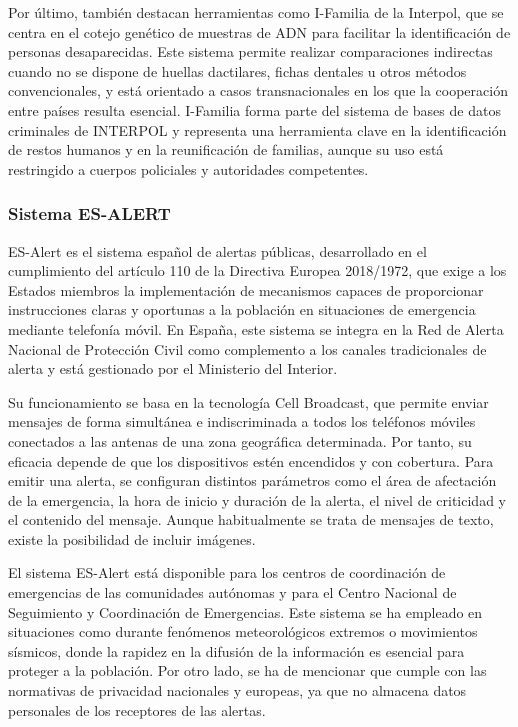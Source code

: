     Por último, también destacan herramientas como I-Familia de la Interpol, que se centra en el cotejo genético de muestras de ADN para facilitar la identificación de personas desaparecidas. Este sistema permite realizar comparaciones indirectas cuando no se dispone de huellas dactilares, fichas dentales u otros métodos convencionales, y está orientado a casos transnacionales en los que la cooperación entre países resulta esencial. I-Familia forma parte del sistema de bases de datos criminales de INTERPOL y representa una herramienta clave en la identificación de restos humanos y en la reunificación de familias, aunque su uso está restringido a cuerpos policiales y autoridades competentes. \cite{interpol_ifamilia} 


    \subsubsection{Sistema ES-ALERT}

    ES-Alert es el sistema español de alertas públicas, desarrollado en el cumplimiento del artículo 110 de la Directiva Europea 2018/1972\cite{DirectivaUE_EsAlert}, que exige a los Estados miembros la implementación de mecanismos capaces de proporcionar instrucciones claras y oportunas a la población en situaciones de emergencia mediante telefonía móvil. En España, este sistema se integra en la Red de Alerta Nacional de Protección Civil como complemento a los canales tradicionales de alerta y está gestionado por el Ministerio del Interior\cite{SistemaEsAlert,ESAlertProteccionCivil}.
    
    Su funcionamiento se basa en la tecnología Cell Broadcast, que permite enviar mensajes de forma simultánea e indiscriminada a todos los teléfonos móviles conectados a las antenas de una zona geográfica determinada. Por tanto, su eficacia depende de que los dispositivos estén encendidos y con cobertura. Para emitir una alerta, se configuran distintos parámetros como el área de afectación de la emergencia, la hora de inicio y duración de la alerta, el nivel de criticidad y el contenido del mensaje. Aunque habitualmente se trata de mensajes de texto, existe la posibilidad de incluir imágenes. 

    El sistema ES-Alert está disponible para los centros de coordinación de emergencias de las comunidades autónomas y para el Centro Nacional de Seguimiento y Coordinación de Emergencias. Este sistema se ha empleado en situaciones como durante fenómenos meteorológicos extremos o movimientos sísmicos, donde la rapidez en la difusión de la información es esencial para proteger a la población. Por otro lado, se ha de mencionar que cumple con las normativas de privacidad nacionales y europeas, ya que no almacena datos personales de los receptores de las alertas.
    
